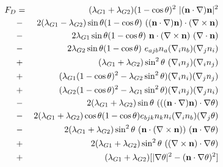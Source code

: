 \documentclass[a4paper]{article}
\begin{document}
\begin{eqnarray*}
F_D
&=& \lgs(1-\ct)^2\ |(\bn\cdot\nabla)\bn|^2\\
%
&-& 2\lgd\st(1-\ct)\  ((\bn\cdot\nabla)\bn)\cdot(\nabla\times\bn)\\
&-& 2\lga\st(1-\ct)\  \bn\cdot(\nabla\times\bn)\ (\nabla\cdot\bn)\\
&-& 2\lgb\st(1-\ct)\ e_{ajb} n_a (\nabla_i n_b)(\nabla_j n_i)\\
%
&+& \lgs\sts\                  (\nabla_i n_j)(\nabla_i n_j)\\
&+& (\lga(1-\ct)^2-\lgb\sts)  (\nabla_i n_i)(\nabla_j n_j)\\
&+& (\lgb(1-\ct)^2-\lga\sts)  (\nabla_i n_j)(\nabla_j n_i)\\
%
&-& 2\lgs\st\ (((\bn\cdot\nabla)\bn)\cdot\nabla\theta)\\
&-& 2\lgs\ct(1-\ct) e_{bjk} n_k n_i (\nabla_i n_b)(\nabla_j \theta)\\
&-& 2\lgs\sts\ (\bn\cdot(\nabla\times\bn))\ (\bn\cdot\nabla\theta)\\
&+& 2\lgs\sts\  ((\nabla\times\bn)\cdot\nabla\theta)\\
%
&+& \lgs[|\nabla\theta|^2 - (\bn\cdot\nabla\theta)^2]
\end{eqnarray*}
\end{document}
